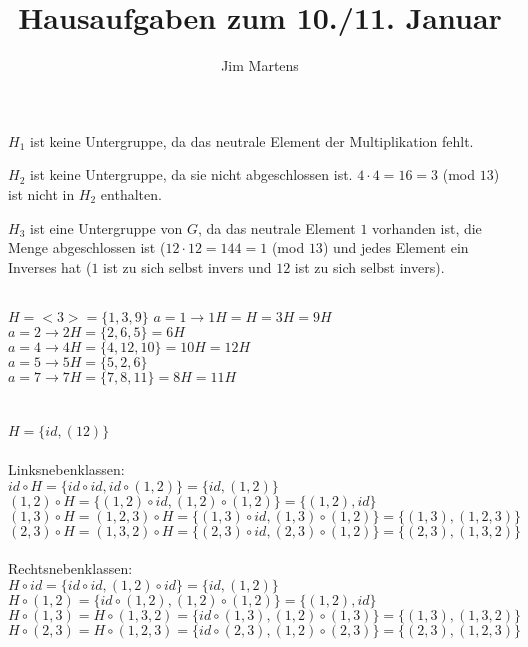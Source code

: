 \documentclass[10pt,a4paper,oneside,ngerman,numbers=noenddot]{scrartcl}
\begin{document}
\author{Jim Martens}
\title{Hausaufgaben zum 10./11. Januar}
\maketitle
\section{} %
\subsection{} %
$H_{1}$ ist keine Untergruppe, da das neutrale Element der Multiplikation fehlt.

$H_{2}$ ist keine Untergruppe, da sie nicht abgeschlossen ist. $4 \cdot 4 = 16 = 3$ (mod $13$) ist nicht in $H_{2}$ enthalten.

$H_{3}$ ist eine Untergruppe von $G$, da das neutrale Element $1$ vorhanden ist, die Menge abgeschlossen ist ($12 \cdot 12 = 144 = 1$ (mod $13$) und jedes Element ein Inverses hat ($1$ ist zu sich selbst invers und $12$ ist zu sich selbst invers).
\subsection{} %
$H = <3> = \{1,3,9\}$
$a=1 \rightarrow 1H = H = 3H = 9H$ \\
$a=2 \rightarrow 2H = \{2,6,5\} = 6H$ \\
$a=4 \rightarrow 4H = \{4,12,10\} = 10H = 12H$ \\
$a=5 \rightarrow 5H = \{5,2,6\}$ \\
$a=7 \rightarrow 7H = \{7,8,11\} = 8H = 11H$
\section{} %
\subsection{} %
$H = \{id, (12)\}$\\
\\
Linksnebenklassen:\\
$id \circ H = \{id \circ id, id \circ (1,2)\} = \{id, (1,2)\}$\\
$(1,2) \circ H = \{(1,2) \circ id, (1,2) \circ (1,2)\} = \{(1,2), id\}$\\
$(1,3) \circ H = (1,2,3) \circ H = \{(1,3) \circ id, (1,3) \circ (1,2)\} = \{(1,3), (1,2,3)\}$\\
$(2,3) \circ H = (1,3,2) \circ H = \{(2,3) \circ id, (2,3) \circ (1,2)\} = \{(2,3), (1,3,2)\}$\\
\\
Rechtsnebenklassen:\\
$H \circ id = \{id \circ id, (1,2) \circ id\} = \{id, (1,2)\}$\\
$H \circ (1,2) = \{id \circ (1,2), (1,2) \circ (1,2)\} = \{(1,2), id\}$\\
$H \circ (1,3) = H \circ (1,3,2) = \{id \circ (1,3), (1,2) \circ (1,3)\} = \{(1,3), (1,3,2)\}$\\
$H \circ (2,3) = H \circ (1,2,3) = \{id \circ (2,3), (1,2) \circ (2,3)\} = \{(2,3), (1,2,3)\}$
\end{document}
